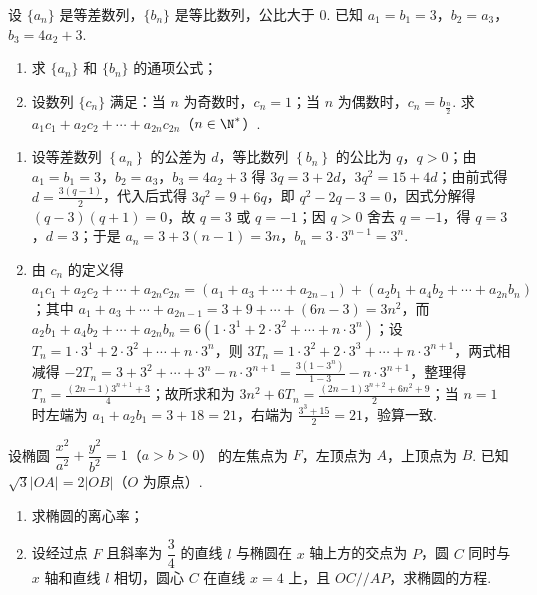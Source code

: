 \begin{problem}
设 \(\{a_n\}\) 是等差数列，\(\{b_n\}\) 是等比数列，公比大于 \(0\). 已知 \(a_1=b_1=3\)，\(b_2=a_3\)，\(b_3=4a_2+3\).

\begin{enumerate}
\item 求 \(\{a_n\}\) 和 \(\{b_n\}\) 的通项公式；
\item 设数列 \(\{c_n\}\) 满足：当 \(n\) 为奇数时，\(c_n=1\)；当 \(n\) 为偶数时，\(c_n=b_{\frac{n}{2}}\). 求 \(a_1c_1+a_2c_2+\cdots+a_{2n}c_{2n}\)（\(n\in\N^*\)）.
\end{enumerate}
\end{problem}

\begin{solution}
\begin{enumerate}
\item 设等差数列 \(\left\{a_{n}\right\}\) 的公差为 \(d\)，等比数列 \(\left\{b_{n}\right\}\) 的公比为 \(q\)，\(q>0\)；由 \(a_{1}=b_{1}=3\)，\(b_{2}=a_{3}\)，\(b_{3}=4a_{2}+3\) 得 \(3q=3+2d\)，\(3q^{2}=15+4d\)；由前式得 \(d=\frac{3\left(q-1\right)}{2}\)，代入后式得 \(3q^{2}=9+6q\)，即 \(q^{2}-2q-3=0\)，因式分解得 \(\left(q-3\right)\left(q+1\right)=0\)，故 \(q=3\) 或 \(q=-1\)；因 \(q>0\) 舍去 \(q=-1\)，得 \(q=3\)，\(d=3\)；于是 \(a_{n}=3+3\left(n-1\right)=3n\)，\(b_{n}=3\cdot 3^{n-1}=3^{n}\).
\item 由 \(c_{n}\) 的定义得 \(a_{1}c_{1}+a_{2}c_{2}+\cdots+a_{2n}c_{2n}=\left(a_{1}+a_{3}+\cdots+a_{2n-1}\right)+\left(a_{2}b_{1}+a_{4}b_{2}+\cdots+a_{2n}b_{n}\right)\)；其中 \(a_{1}+a_{3}+\cdots+a_{2n-1}=3+9+\cdots+\left(6n-3\right)=3n^{2}\)，而 \(a_{2}b_{1}+a_{4}b_{2}+\cdots+a_{2n}b_{n}=6\left(1\cdot 3^{1}+2\cdot 3^{2}+\cdots+n\cdot 3^{n}\right)\)；设 \(T_{n}=1\cdot 3^{1}+2\cdot 3^{2}+\cdots+n\cdot 3^{n}\)，则 \(3T_{n}=1\cdot 3^{2}+2\cdot 3^{3}+\cdots+n\cdot 3^{n+1}\)，两式相减得 \(-2T_{n}=3+3^{2}+\cdots+3^{n}-n\cdot 3^{n+1}=\frac{3\left(1-3^{n}\right)}{1-3}-n\cdot 3^{n+1}\)，整理得 \(T_{n}=\frac{\left(2n-1\right)3^{n+1}+3}{4}\)；故所求和为 \(3n^{2}+6T_{n}=\frac{\left(2n-1\right)3^{n+2}+6n^{2}+9}{2}\)；当 \(n=1\) 时左端为 \(a_{1}+a_{2}b_{1}=3+18=21\)，右端为 \(\frac{3^{3}+15}{2}=21\)，验算一致.
\end{enumerate}
\end{solution}

\begin{problem}
设椭圆 \(\dfrac{x^2}{a^2}+\dfrac{y^2}{b^2}=1\)（\(a>b>0\)） 的左焦点为 \(F\)，左顶点为 \(A\)，上顶点为 \(B\). 已知 \(\sqrt3|OA|=2|OB|\)（\(O\) 为原点）.

\begin{enumerate}
\item 求椭圆的离心率；
\item 设经过点 \(F\) 且斜率为 \(\dfrac34\) 的直线 \(l\) 与椭圆在 \(x\) 轴上方的交点为 \(P\)，圆 \(C\) 同时与 \(x\) 轴和直线 \(l\) 相切，圆心 \(C\) 在直线 \(x=4\) 上，且 \(OC//AP\)，求椭圆的方程.
\end{enumerate}
\end{problem}

